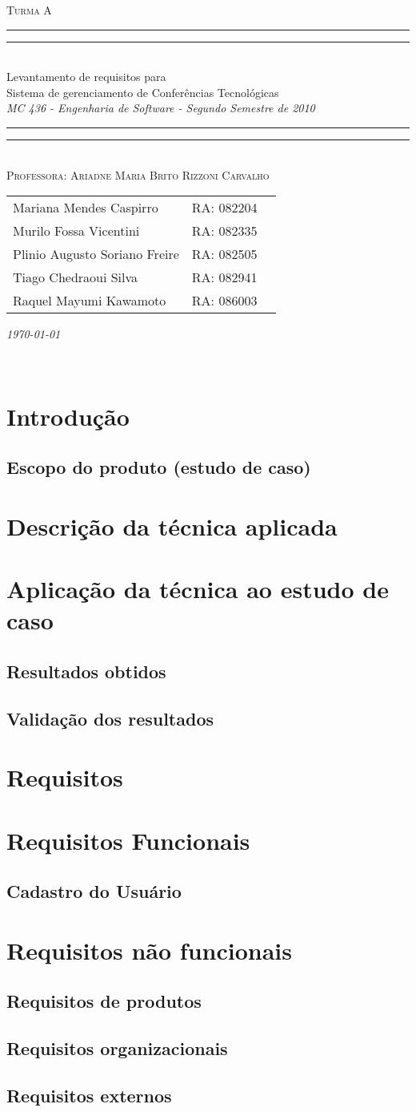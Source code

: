 \documentclass[letter]{article}
\newcommand*{\titleTMB}{\begingroup \centering \settowidth{\unitlength}{\LARGE MC 613} \vspace*{\baselineskip} {\large\scshape  Turma A}\\[\baselineskip] \rule{11.0cm}{1.6pt}\vspace*{-\baselineskip}\vspace*{2pt} \rule{11.0cm}{0.4pt}\\[\baselineskip] {\LARGE Levantamento de requisitos para }\\[0.2\baselineskip] {\LARGE Sistema de gerenciamento de Conferências Tecnológicas }\\[0.2\baselineskip] {\itshape MC 436 - Engenharia de Software - Segundo Semestre de 2010}\\[0.2\baselineskip] \rule{11.0cm}{0.4pt}\vspace*{-\baselineskip}\vspace{3.2pt} \rule{11.0cm}{1.6pt}\\[\baselineskip] {\large\scshape Professora: Ariadne Maria Brito Rizzoni Carvalho}\par \vfill {\normalsize   \scshape 
    \begin{center} 
      \begin{tabular}{  l  l  p{5cm} } 
        Mariana Mendes Caspirro & RA: 082204\\
        Murilo Fossa Vicentini & RA: 082335 \\
        Plinio Augusto Soriano Freire & RA:  082505\\
        Tiago Chedraoui Silva  & RA: 082941\\
Raquel Mayumi Kawamoto & RA: 086003 \\    
  \end{tabular} \end{center}
    \itshape \today }\\[\baselineskip] \vspace{3.2pt} \endgroup}
\begin{document}
\titleTMB 
\newpage

  \begin{abstract}
=)
  \end{abstract}
\newpage
  \tableofcontents


\section{Introdução}
\subsection{Escopo do produto (estudo de caso)}
\section{Descrição da técnica aplicada}
\section{Aplicação da técnica ao estudo de caso}
\subsection{Resultados obtidos}
\subsection{Validação dos resultados}
\section{Requisitos}
\section{Requisitos Funcionais}
\subsection{Cadastro do Usuário}
\section{Requisitos não funcionais}
\subsection{Requisitos de produtos}
\subsection{Requisitos organizacionais}
\subsection{Requisitos externos}
\end{document}
